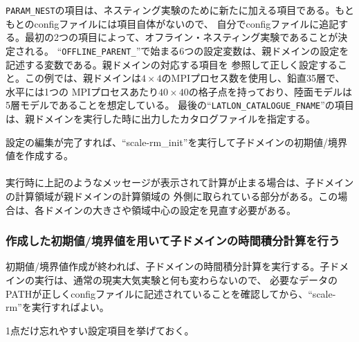 \verb|PARAM_NEST|の項目は、ネスティング実験のために新たに加える項目である。もともとのconfigファイルには項目自体がないので、
自分でconfigファイルに追記する。最初の2つの項目によって、オフライン・ネスティング実験であることが決定される。
``\verb|OFFLINE_PARENT_|''で始まる6つの設定変数は、親ドメインの設定を記述する変数である。親ドメインの対応する項目を
参照して正しく設定すること。この例では、親ドメインは$4 \times 4$のMPIプロセス数を使用し、鉛直35層で、水平には1つの
MPIプロセスあたり$40 \times 40$の格子点を持っており、陸面モデルは5層モデルであることを想定している。
最後の``\verb|LATLON_CATALOGUE_FNAME|''の項目は、親ドメインを実行した時に出力したカタログファイルを指定する。

設定の編集が完了すれば、``scale-rm\_init''を実行して子ドメインの初期値/境界値を作成する。\\

\\

\noindent 実行時に上記のようなメッセージが表示されて計算が止まる場合は、子ドメインの計算領域が親ドメインの計算領域の
外側に取られている部分がある。この場合は、各ドメインの大きさや領域中心の設定を見直す必要がある。


\subsubsection{作成した初期値/境界値を用いて子ドメインの時間積分計算を行う}
初期値/境界値作成が終われば、子ドメインの時間積分計算を実行する。子ドメインの実行は、通常の現実大気実験と何も変わらないので、
必要なデータのPATHが正しくconfigファイルに記述されていることを確認してから、``scale-rm''を実行すればよい。

1点だけ忘れやすい設定項目を挙げておく。\\

\\

